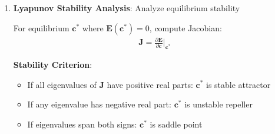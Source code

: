 \documentclass[11pt,a4paper]{article}
\theoremstyle{definition}
\theoremstyle{remark}
\newcommand{\EE}{\mathbf{E}}
\newcommand{\cc}{\mathbf{c}}
\begin{document}
\begin{enumerate}[leftmargin=*]
When \(\nabla \times \EE \neq 0\), the ethical "work" done depends on the path taken—circular paths can trap consciousness in loops (addiction cycles, cult dynamics).

\item \textbf{Lyapunov Stability Analysis}: Analyze equilibrium stability

For equilibrium \(\cc^*\) where \(\EE(\cc^*) = 0\), compute Jacobian:
\begin{align}
\mathbf{J} = \frac{\partial \EE}{\partial \cc}\bigg|_{\cc^*}
\end{align}

\textbf{Stability Criterion}:
\begin{itemize}
    \item If all eigenvalues of \(\mathbf{J}\) have positive real parts: \(\cc^*\) is stable attractor
    \item If any eigenvalue has negative real part: \(\cc^*\) is unstable repeller
    \item If eigenvalues span both signs: \(\cc^*\) is saddle point
\end{itemize}
\end{enumerate}
\end{document}
